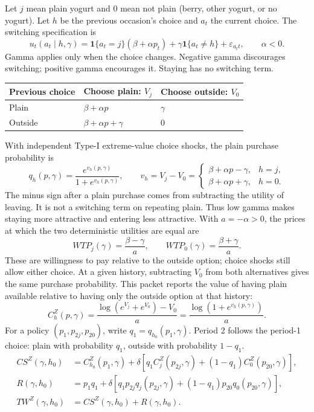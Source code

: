 \newpage
{}
\small
Let $j$ mean plain yogurt and $0$ mean not plain (berry, other yogurt, or no yogurt).
Let $h$ be the previous occasion's choice and $a_t$ the current choice.
The switching specification is
\[
u_t(a_t\mid h,\gamma)
=\mathbf1\{a_t=j\}(\beta+\alpha p_t)
+\gamma\mathbf1\{a_t\ne h\}+\varepsilon_{a_t t},\qquad \alpha<0.
\]
Gamma applies only when the choice changes. Negative gamma discourages switching;
positive gamma encourages it. Staying has no switching term.
\begin{center}
\renewcommand{\arraystretch}{1.4}
\begin{tabular}{lll}
\toprule
Previous choice & Choose plain: $V_j$ & Choose outside: $V_0$\\
\midrule
Plain & $\beta+\alpha p$ & $\gamma$\\
Outside & $\beta+\alpha p+\gamma$ & $0$\\
\bottomrule
\end{tabular}
\end{center}
With independent Type-I extreme-value choice shocks, the plain purchase probability is
\[
q_h(p,\gamma)=\frac{e^{v_h(p,\gamma)}}{1+e^{v_h(p,\gamma)}},\qquad
v_h=V_j-V_0=
\begin{cases}
\beta+\alpha p-\gamma,&h=j,\\
\beta+\alpha p+\gamma,&h=0.
\end{cases}
\]
The minus sign after a plain purchase comes from subtracting the utility of leaving.
It is not a switching term on repeating plain. Thus low gamma makes staying more
attractive and entering less attractive. With $a=-\alpha>0$, the prices at which the
two deterministic utilities are equal are
\[
WTP_j(\gamma)=\frac{\beta-\gamma}{a},\qquad
WTP_0(\gamma)=\frac{\beta+\gamma}{a}.
\]
These are willingness to pay relative to the outside option; choice shocks still allow either choice.
\newpage
{}
\small
At a given history, subtracting $V_0$ from both alternatives gives the same purchase
probability. This packet reports the value of having plain available relative to
having only the outside option at that history:
\[
C_h^Z(p,\gamma)
=\frac{\log(e^{V_j}+e^{V_0})-V_0}{a}
=\frac{\log(1+e^{v_h(p,\gamma)})}{a}.
\]
For a policy $(p_1,p_{2j},p_{20})$, write $q_1=q_{h_0}(p_1,\gamma)$.
Period 2 follows the period-1 choice: plain with probability $q_1$, outside with probability $1-q_1$.
\begin{align*}
CS^Z(\gamma,h_0)
&=C_{h_0}^Z(p_1,\gamma)
+\delta\left[q_1C_j^Z(p_{2j},\gamma)+(1-q_1)C_0^Z(p_{20},\gamma)\right],\\
R(\gamma,h_0)
&=p_1q_1+\delta\left[q_1p_{2j}q_j(p_{2j},\gamma)
+(1-q_1)p_{20}q_0(p_{20},\gamma)\right],\\
TW^Z(\gamma,h_0)&=CS^Z(\gamma,h_0)+R(\gamma,h_0).
\end{align*}
